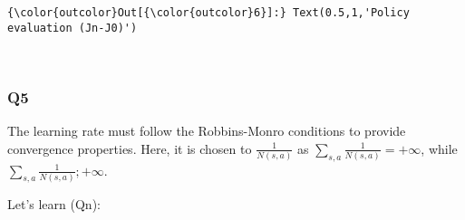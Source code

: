 \documentclass[11pt]{article}
\begin{document}
\begin{Verbatim}[commandchars=\\\{\}]
{\color{outcolor}Out[{\color{outcolor}6}]:} Text(0.5,1,'Policy evaluation (Jn-J0)')
\end{Verbatim}
            
    \begin{center}
    \end{center}
    { \hspace*{\fill} \\}
    
    \subsubsection{Q5}\label{q5}

The learning rate must follow the Robbins-Monro conditions to provide
convergence properties. Here, it is chosen to \(\frac{1}{N(s,a)}\) as
\(\sum_{s,a} \frac{1}{N(s,a)} = +\infty\), while
\(\sum_{s,a} \frac{1}{N(s,a)} ; +\infty\).

    Let's learn (Qn):
\end{document}
